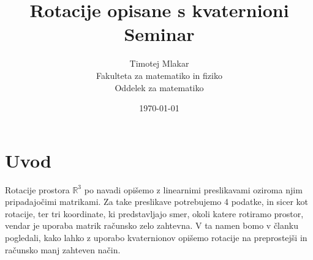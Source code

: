 \documentclass[a4paper,12pt]{article}
\title{Rotacije opisane s kvaternioni \\ 
\Large Seminar}
\author{Timotej Mlakar \\
Fakulteta za matematiko in fiziko \\
Oddelek za matematiko}
\date{\today}
\def\R{\mathbb{R}} %
\begin{document}

\maketitle
\newpage
\tableofcontents


\newpage
\section{Uvod}

Rotacije prostora $\R^3$ po navadi opišemo z linearnimi preslikavami oziroma njim pripadajočimi matrikami. Za take preslikave potrebujemo 4 podatke,
in sicer kot rotacije, ter tri koordinate, ki predstavljajo smer, okoli katere rotiramo prostor,
vendar je uporaba matrik računsko zelo zahtevna. V ta namen bomo v članku pogledali, kako lahko z uporabo kvaternionov 
opišemo rotacije na preprostejši in računsko manj zahteven način.



\end{document}
